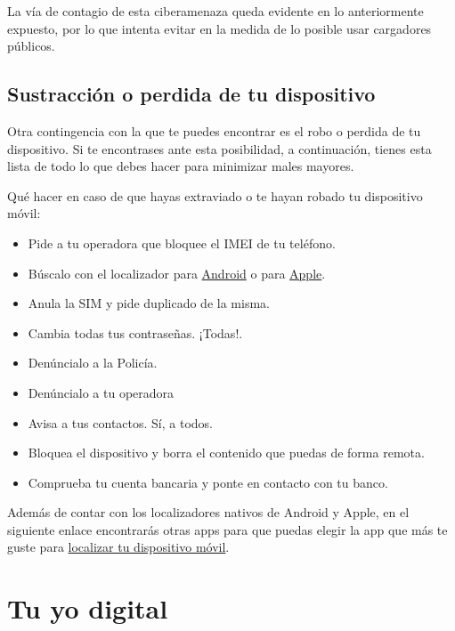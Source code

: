 \documentclass[
  a4paper,
  openany]{book}
\begin{document}
La vía de contagio de esta ciberamenaza queda evidente en lo anteriormente expuesto, por lo que intenta evitar en la medida de lo posible usar cargadores públicos.

\hypertarget{sustracciuxf3n-o-perdida-de-tu-dispositivo}{%
\section{Sustracción o perdida de tu dispositivo}\label{sustracciuxf3n-o-perdida-de-tu-dispositivo}}

Otra contingencia con la que te puedes encontrar es el robo o perdida de tu dispositivo. Si te encontrases ante esta posibilidad, a continuación, tienes esta lista de todo lo que debes hacer para minimizar males mayores.

Qué hacer en caso de que hayas extraviado o te hayan robado tu dispositivo móvil:

\begin{itemize}
\item
  Pide a tu operadora que bloquee el IMEI de tu teléfono.
\item
  Búscalo con el localizador para \href{https://myaccount.google.com/intro/find-your-phone?hl=es-ES}{Android} o para \href{https://www.apple.com/es/icloud/find-my/}{Apple}.
\item
  Anula la SIM y pide duplicado de la misma.
\item
  Cambia todas tus contraseñas. ¡Todas!.
\item
  Denúncialo a la Policía.
\item
  Denúncialo a tu operadora
\item
  Avisa a tus contactos. Sí, a todos.
\item
  Bloquea el dispositivo y borra el contenido que puedas de forma remota.
\item
  Comprueba tu cuenta bancaria y ponte en contacto con tu banco.
\end{itemize}

Además de contar con los localizadores nativos de Android y Apple, en el siguiente enlace encontrarás otras apps para que puedas elegir la app que más te guste para \href{https://www.osi.es/es/herramientas-gratuitas?herramienta_selec\%5B0\%5D=122}{localizar tu dispositivo móvil}.

\hypertarget{tu-yo-digital}{%
\chapter{Tu yo digital}\label{tu-yo-digital}}
\end{document}
